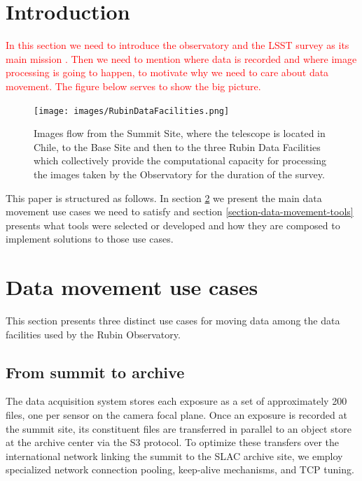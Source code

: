 \documentclass{webofc}
\begin{document}
\maketitle

\section{Introduction}
\label{introduction}
\textcolor{red}{In this section we need to introduce the observatory and the LSST survey as its main mission \cite{Ivezic:2019}. Then we need to mention where data is recorded and where image processing is going to happen, to motivate why we need to care about data movement. The figure below serves to show the big picture.}

\begin{figure}[h]
\texttt{[image: images/RubinDataFacilities.png]}
\caption{Images flow from the Summit Site, where the telescope is located in Chile, to the Base Site and then to the three Rubin Data Facilities which collectively provide the computational capacity for processing the images taken by the Observatory for the duration of the survey.}
\label{fig:data-facilities}
\end{figure}

This paper is structured as follows. In section \ref{section-data-movement-use-cases} we present the main data movement use cases we need to satisfy and section \ref{section-data-movement-tools} presents what tools were selected or developed and how they are composed to implement solutions to those use cases.

\section{Data movement use cases}
\label{section-data-movement-use-cases}

This section presents three distinct use cases for moving data among the data facilities used by the Rubin Observatory.

\subsection{From summit to archive}
\label{summit-to-archive}

The data acquisition system stores each exposure as a set of approximately 200 files, one per sensor on the camera focal plane. Once an exposure is recorded at the summit site, its constituent files are transferred in parallel to an object store at the archive center via the S3 protocol. To optimize these transfers over the international network linking the summit to the SLAC archive site, we employ specialized network connection pooling, keep-alive mechanisms, and TCP tuning.
\end{document}
